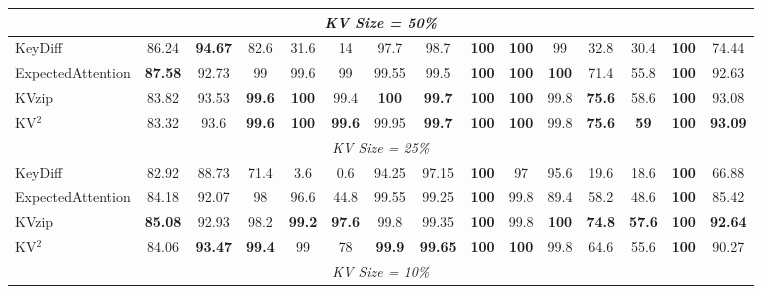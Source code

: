 \documentclass[11pt]{article}
\begin{document}
\begin{table}[htbp]
\begin{tabular}{l|cc|cccccccc|cc|c|c}
\midrule
\multicolumn{15}{c}{\textit{KV Size = 50\%}} \\
\midrule

KeyDiff
    & 86.24 & \textbf{94.67}
    & 82.6 & 31.6 & 14
    & 97.7 & 98.7
    & \textbf{100} & \textbf{100} & 99
    & 32.8 & 30.4
    & \textbf{100}
    & 74.44 \\

ExpectedAttention
    & \textbf{87.58} & 92.73
    & 99 & 99.6 & 99
    & 99.55 & 99.5
    & \textbf{100} & \textbf{100} & \textbf{100}
    & 71.4 & 55.8
    & \textbf{100}
    & 92.63 \\

KVzip
    & 83.82 & 93.53
    & \textbf{99.6} & \textbf{100} & 99.4
    & \textbf{100} & \textbf{99.7}
    & \textbf{100} & \textbf{100} & 99.8
    & \textbf{75.6} & 58.6
    & \textbf{100}
    & 93.08 \\

KV$^2$
    & 83.32 & 93.6
    & \textbf{99.6} & \textbf{100} & \textbf{99.6}
    & 99.95 & \textbf{99.7}
    & \textbf{100} & \textbf{100} & 99.8
    & \textbf{75.6} & \textbf{59}
    & \textbf{100}
    & \textbf{93.09} \\

\midrule
\multicolumn{15}{c}{\textit{KV Size = 25\%}} \\
\midrule

KeyDiff
    & 82.92 & 88.73
    & 71.4 & 3.6 & 0.6
    & 94.25 & 97.15
    & \textbf{100} & 97 & 95.6
    & 19.6 & 18.6
    & \textbf{100}
    & 66.88 \\

ExpectedAttention
    & 84.18 & 92.07
    & 98 & 96.6 & 44.8
    & 99.55 & 99.25
    & \textbf{100} & 99.8 & 89.4
    & 58.2 & 48.6
    & \textbf{100}
    & 85.42 \\

KVzip
    & \textbf{85.08} & 92.93
    & 98.2 & \textbf{99.2} & \textbf{97.6}
    & 99.8 & 99.35
    & \textbf{100} & 99.8 & \textbf{100}
    & \textbf{74.8} & \textbf{57.6}
    & \textbf{100}
    & \textbf{92.64} \\

KV$^2$
    & 84.06 & \textbf{93.47}
    & \textbf{99.4} & 99 & 78
    & \textbf{99.9} & \textbf{99.65}
    & \textbf{100} & \textbf{100} & 99.8
    & 64.6 & 55.6
    & \textbf{100}
    & 90.27 \\

\midrule
\multicolumn{15}{c}{\textit{KV Size = 10\%}} \\
\midrule


\end{tabular}
\end{table}
\end{document}
